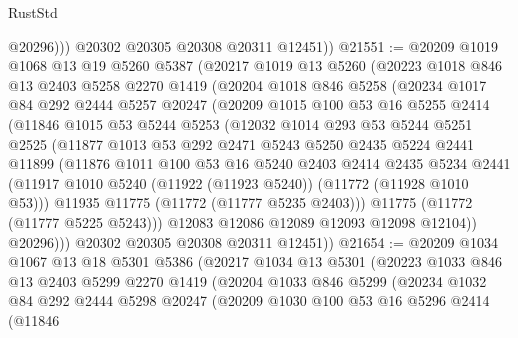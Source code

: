 \begin{lexlean}{RustStd}
\begin{coremodule}
              @20296)))
        @20302
        @20305
        @20308
        @20311
        @12451))
@21551 := @20209
    @1019
    @1068
    @13
    @19
    @5260
    @5387
    (@20217
      @1019
      @13
      @5260
      (@20223
        @1018
        @846
        @13
        @2403
        @5258
        @2270
        @1419
        (@20204
          @1018
          @846
          @5258
          (@20234
            @1017
            @84
            @292
            @2444
            @5257
            @20247
            (@20209
              @1015
              @100
              @53
              @16
              @5255
              @2414
              (@11846
                @1015
                @53
                @5244
                @5253
                (@12032
                  @1014
                  @293
                  @53
                  @5244
                  @5251
                  @2525
                  (@11877
                    @1013
                    @53
                    @292
                    @2471
                    @5243
                    @5250
                    @2435
                    @5224
                    @2441
                    @11899
                    (@11876
                      @1011
                      @100
                      @53
                      @16
                      @5240
                      @2403
                      @2414
                      @2435
                      @5234
                      @2441
                      (@11917 @1010 @5240 (@11922 (@11923 @5240)) (@11772 (@11928 @1010 @53)))
                      @11935
                      @11775
                      (@11772 (@11777 @5235 @2403)))
                    @11775
                    (@11772 (@11777 @5225 @5243)))
                  @12083
                  @12086
                  @12089
                  @12093
                  @12098
                  @12104))
              @20296)))
        @20302
        @20305
        @20308
        @20311
        @12451))
@21654 := @20209
    @1034
    @1067
    @13
    @18
    @5301
    @5386
    (@20217
      @1034
      @13
      @5301
      (@20223
        @1033
        @846
        @13
        @2403
        @5299
        @2270
        @1419
        (@20204
          @1033
          @846
          @5299
          (@20234
            @1032
            @84
            @292
            @2444
            @5298
            @20247
            (@20209
              @1030
              @100
              @53
              @16
              @5296
              @2414
              (@11846

\end{coremodule}
\end{lexlean}
